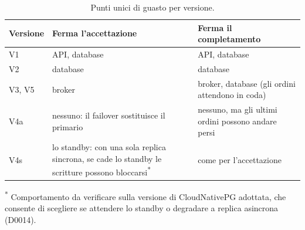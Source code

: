 \begin{table}[htbp]
\centering
\caption{Punti unici di guasto per versione.}
\label{tab:spof}
\begin{tabularx}{\linewidth}{@{}lLL@{}}
\toprule
\textbf{Versione} & \textbf{Ferma l'accettazione} & \textbf{Ferma il completamento} \\
\midrule
V1 & API, database & API, database \\
V2 & database & database \\
V3, V5 & broker & broker, database (gli ordini attendono in coda) \\
V4a & nessuno: il failover sostituisce il primario & nessuno, ma gli ultimi ordini possono andare persi \\
V4s & lo standby: con una sola replica sincrona, se cade lo standby le scritture possono bloccarsi\textsuperscript{*} & come per l'accettazione \\
\bottomrule
\end{tabularx}

\vspace{2pt}
{\footnotesize\textsuperscript{*} Comportamento da verificare sulla versione di CloudNativePG adottata, che consente di scegliere se attendere lo standby o degradare a replica asincrona (D0014).\par}
\end{table}
